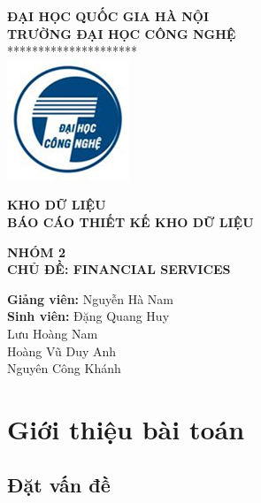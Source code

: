 \documentclass{article}
\begin{document}
\begin{center}
    \textbf{\Large ĐẠI HỌC QUỐC GIA HÀ NỘI}\\
    \textbf{\Large TRƯỜNG ĐẠI HỌC CÔNG NGHỆ}\\
    
    *********************\\
    \vskip 0.5in
    \includegraphics[scale=1.5]{UETLogo.png}

    \vskip 0.5in
    \textbf{\large KHO DỮ LIỆU}\\
    
    \textbf{\large BÁO CÁO THIẾT KẾ KHO DỮ LIỆU}\\
    
    \vskip 0.3in
    
    \textbf{\large NHÓM 2}\\
    \textbf{\large CHỦ ĐỀ: FINANCIAL SERVICES}\\
\end{center}
\vskip 0.5in
\begin{flushleft}
    \textbf{Giảng viên:} \hspace{0.6cm} Nguyễn Hà Nam\\
    \vskip 0.2in
    \textbf{Sinh viên:} \hspace{1cm}Đặng Quang Huy\\
    \hspace{2.8cm} Lưu Hoàng Nam\\
    \hspace{2.8cm} Hoàng Vũ Duy Anh\\
    \hspace{2.8cm} Nguyên Công Khánh\\
    
\end{flushleft}


\newpage
\section{Giới thiệu bài toán}
\subsection{Đặt vấn đề}
\end{document}
